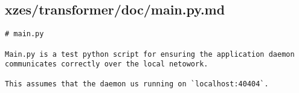 \subsection{xzes/transformer/doc/main.py.md}
\begin{lstlisting}[caption={Documentation specifically about the proof of concept `main.py' script.}]
# main.py

Main.py is a test python script for ensuring the application daemon communicates correctly over the local netowork.

This assumes that the daemon us running on `localhost:40404`.
\end{lstlisting}
